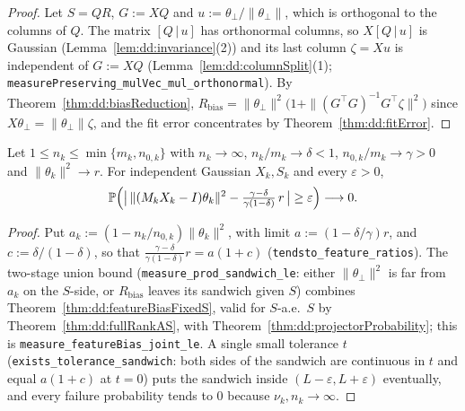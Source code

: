 \begin{proof}
  \leanok
Let $S=QR$, $G:=XQ$ and $u:=\theta_\perp/\|\theta_\perp\|$, which is orthogonal to the columns of $Q$. The matrix $[Q\,|\,u]$ has orthonormal columns, so $X[Q\,|\,u]$ is Gaussian
(Lemma~\ref{lem:dd:invariance}(2)) and its last column $\zeta=Xu$ is independent of $G:=XQ$ (Lemma~\ref{lem:dd:columnSplit}(1); \texttt{measurePreserving\_mulVec\_mul\_orthonormal}). By
Theorem~\ref{thm:dd:biasReduction}, $R_{\mathrm{bias}}=\|\theta_\perp\|^2\bigl(1+\|(G^\top G)^{-1}G^\top\zeta\|^2\bigr)$ since $X\theta_\perp=\|\theta_\perp\|\zeta$, and the fit error concentrates by Theorem~\ref{thm:dd:fitError}.
\end{proof}

\begin{theorem}\label{thm:dd:featureBiasProb}
  \leanok
Let $1\le n_k\le\min\{m_k,n_{0,k}\}$ with $n_k\to\infty$, $n_k/m_k\to\delta<1$, $n_{0,k}/m_k\to\gamma>0$ and $\|\theta_k\|^2\to r$. For independent Gaussian $X_k,S_k$ and every $\varepsilon>0$,
\[
  \mathbb P\Bigl(\bigl|\,\|(M_kX_k-I)\theta_k\|^2-\tfrac{\gamma-\delta}{\gamma(1-\delta)}\,r\,\bigr|\ge\varepsilon\Bigr)\longrightarrow0 .
\]
\end{theorem}

\begin{proof}
  \leanok
Put $a_k:=(1-n_k/n_{0,k})\|\theta_k\|^2$, with limit $a:=(1-\delta/\gamma)r$, and $c:=\delta/(1-\delta)$, so that $\frac{\gamma-\delta}{\gamma(1-\delta)}r=a(1+c)$ (\texttt{tendsto\_feature\_ratios}). The two-stage union bound
(\texttt{measure\_prod\_sandwich\_le}: either $\|\theta_\perp\|^2$ is far from $a_k$ on the $S$-side, or $R_{\mathrm{bias}}$ leaves its sandwich given $S$) combines Theorem~\ref{thm:dd:featureBiasFixedS}, valid for $S$-a.e.\ $S$ by
Theorem~\ref{thm:dd:fullRankAS}, with Theorem~\ref{thm:dd:projectorProbability}; this is \texttt{measure\_featureBias\_joint\_le}. A single small tolerance $t$ (\texttt{exists\_tolerance\_sandwich}:
both sides of the sandwich are continuous in $t$ and equal $a(1+c)$ at $t=0$) puts the sandwich inside $(L-\varepsilon,L+\varepsilon)$ eventually, and every failure probability tends to $0$ because $\nu_k,n_k\to\infty$.
\end{proof}

